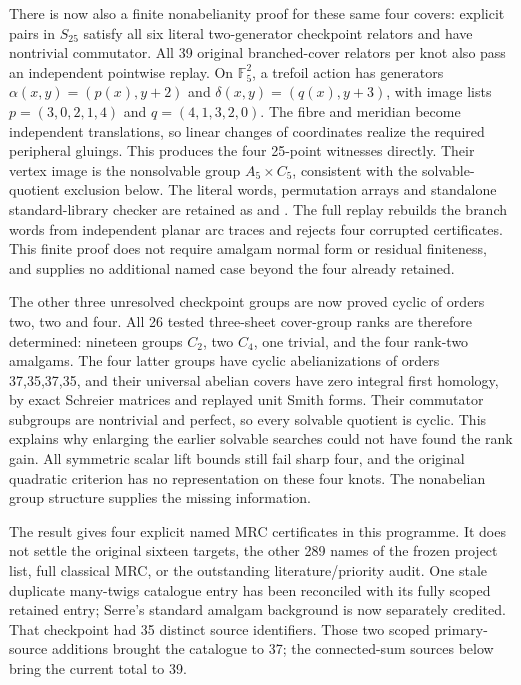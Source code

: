 \documentclass[11pt]{article}
\begin{document}
There is now also a finite nonabelianity proof for these same
four covers: explicit pairs in $S_{25}$ satisfy all six literal
two-generator checkpoint relators and have nontrivial commutator.
All 39 original branched-cover relators per knot also pass an
independent pointwise replay. On $\mathbb F_5^2$, a trefoil action
has generators $\alpha(x,y)=(p(x),y+2)$ and
$\delta(x,y)=(q(x),y+3)$, with image lists
$p=(3,0,2,1,4)$ and $q=(4,1,3,2,0)$.
The fibre and meridian become independent translations, so
linear changes of coordinates realize the required peripheral
gluings. This produces the four 25-point witnesses directly.
Their vertex image is the nonsolvable group $A_5\times C_5$,
consistent with the solvable-quotient exclusion below.
The literal words, permutation arrays and standalone
standard-library checker are retained as
 and
.
The full replay rebuilds the branch words from independent
planar arc traces and rejects four corrupted certificates.
This finite proof does not require amalgam normal form or
residual finiteness, and supplies no additional named case
beyond the four already retained.

The other three unresolved checkpoint groups are now
proved cyclic of orders two, two and four. All 26 tested
three-sheet cover-group ranks are therefore determined:
nineteen groups $C_2$, two $C_4$, one trivial, and the four
rank-two amalgams. The four latter groups have cyclic
abelianizations of orders 37,35,37,35, and their universal
abelian covers have zero integral first homology, by exact
Schreier matrices and replayed unit Smith forms. Their
commutator subgroups are nontrivial and perfect, so every
solvable quotient is cyclic. This explains why enlarging
the earlier solvable searches could not have found the
rank gain. All symmetric scalar lift bounds still fail
sharp four, and the original quadratic criterion has no
representation on these four knots. The nonabelian group
structure supplies the missing information.

The result gives four explicit named MRC certificates in
this programme. It does not settle the original sixteen
targets, the other 289 names of the frozen project list,
full classical MRC, or the outstanding literature/priority
audit. One stale duplicate many-twigs catalogue entry has
been reconciled with its fully scoped retained entry;
Serre's standard amalgam background is now separately
credited. That checkpoint had 35 distinct source identifiers.
Those two scoped primary-source additions brought the catalogue to 37;
the connected-sum sources below bring the current total to 39.
\end{document}
